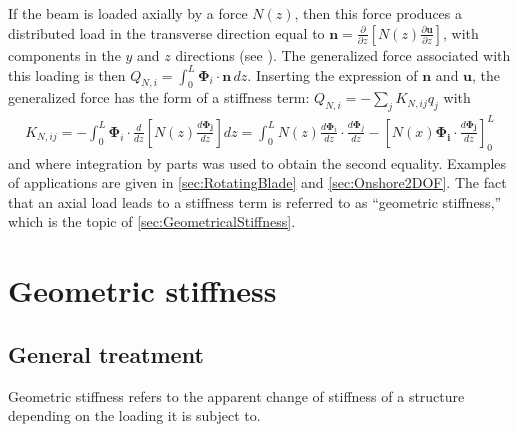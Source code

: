 \documentclass[wes, manuscript]{copernicus}
\renewcommand{\v}[1]{\boldsymbol{#1}}
\newcommand{\todoBoth}    [1]{{\colorbox{yellow}{TODO Both:    }}{\color{red}{#1}}\colorbox{yellow}{/}}
\begin{document}
If the beam is loaded axially by a force $N(z)$, then this force produces a distributed load in the transverse direction equal to $\v{n} = \frac{\partial}{\partial z}\left[N(z)\frac{\partial \v{u}}{\partial z}\right]$, with components in the $y$ and $z$ directions (see \cite{branlard:2019flex}).
The generalized force associated with this loading is then $Q_{N,i}=\int_0^L \v{\Phi}_i\cdot \v{n}\, dz$.
Inserting the expression of $\v{n}$ and $\v{u}$, the generalized force has the form of a stiffness term: $Q_{N,i} =-\sum_j K_{N,ij} q_j$ with
\begin{align}
   K_{N,ij} = -\int_0^L \v{\Phi}_i \cdot \frac{d}{d z} \left[N(z) \frac{d \v{\Phi_j}}{d z}\right] dz  
       = \int_0^L N(z) \frac{d \v{\Phi}_i }{dz}\cdot \frac{d \v{\Phi}_j }{dz} - \left[N(x) \v{\Phi_i}\cdot \frac{d\v{\Phi_j}}{dz}\right]_0^L
   \label{eq:StiffnessAxial}
\end{align}
and where integration by parts was used to obtain the second equality.
Examples of applications are given in \autoref{sec:RotatingBlade} and \autoref{sec:Onshore2DOF}.
The fact that an axial load leads to a stiffness term is referred to as ``geometric stiffness,'' which is the topic of \autoref{sec:GeometricalStiffness}.





\section{Geometric stiffness}
\label{sec:GeometricalStiffness}
\subsection{General treatment}
Geometric stiffness refers to the apparent change of stiffness of a structure depending on the loading it is subject to.
\end{document}
